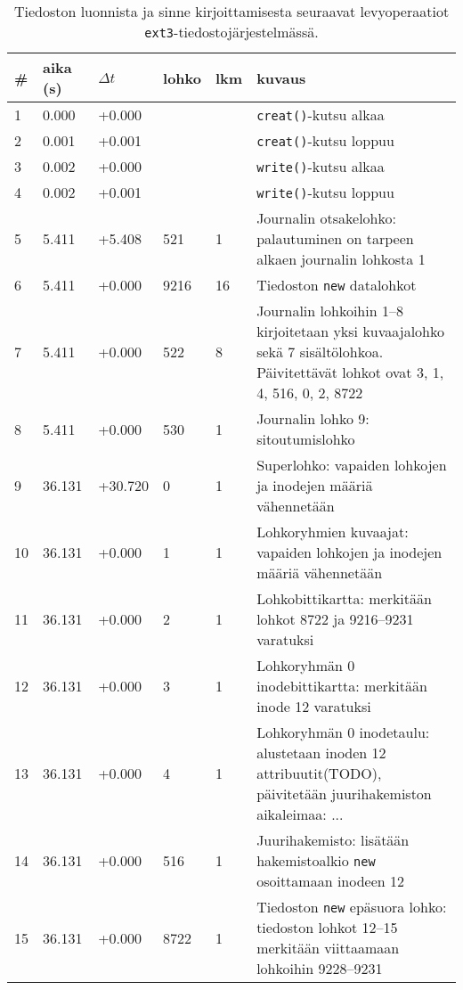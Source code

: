 \begin{table}[H]
\label{TabExt3CreatAndWrite}
\begin{tabular}{l | l | l | l | l | p{7cm}}
    \# & aika (s) & $\Delta t$ & lohko & lkm & kuvaus \\ \hline \hline
    1  & 0.000    & +0.000   &      &      & \texttt{creat()}-kutsu alkaa   \\ \hline %
    2  & 0.001    & +0.001   &      &      & \texttt{creat()}-kutsu loppuu  \\ \hline %
    3  & 0.002    & +0.000   &      &      & \texttt{write()}-kutsu alkaa   \\ \hline %
    4  & 0.002    & +0.001   &      &      & \texttt{write()}-kutsu loppuu  \\ \hline %
    5  & 5.411    & +5.408   & 521  & 1    & Journalin otsakelohko: palautuminen on tarpeen alkaen journalin lohkosta 1                       \\ \hline %
    6  & 5.411    & +0.000   & 9216 & 16   & Tiedoston \texttt{new} datalohkot                               \\ \hline %
    7  & 5.411    & +0.000   & 522  & 8    & Journalin lohkoihin 1--8 kirjoitetaan yksi kuvaajalohko sekä 7 sisältölohkoa. Päivitettävät lohkot ovat 3, 1, 4, 516, 0, 2, 8722                       \\ \hline %
    8  & 5.411    & +0.000   & 530  & 1    & Journalin lohko 9: sitoutumislohko                       \\ \hline %
    9  & 36.131   & +30.720  & 0    & 1    & Superlohko: vapaiden lohkojen ja inodejen määriä vähennetään                     \\ \hline %
    10 & 36.131   & +0.000   & 1    & 1    & Lohkoryhmien kuvaajat: vapaiden lohkojen ja inodejen määriä vähennetään                     \\ \hline %
    11 & 36.131   & +0.000   & 2    & 1    & Lohkobittikartta: merkitään lohkot 8722 ja 9216--9231 varatuksi                     \\ \hline %
    12 & 36.131   & +0.000   & 3    & 1    & Lohkoryhmän 0 inodebittikartta: merkitään inode 12 varatuksi \\ \hline %
    13 & 36.131   & +0.000   & 4    & 1    & Lohkoryhmän 0 inodetaulu: alustetaan inoden 12 attribuutit(TODO), päivitetään juurihakemiston aikaleimaa: ...                     \\ \hline %
    14 & 36.131   & +0.000   & 516  & 1    & Juurihakemisto: lisätään hakemistoalkio \texttt{new} osoittamaan inodeen 12                 \\ \hline %
    15 & 36.131   & +0.000   & 8722 & 1    & Tiedoston \texttt{new} epäsuora lohko: tiedoston lohkot 12--15 merkitään viittaamaan lohkoihin 9228--9231 \\        %
\end{tabular}
\caption{Tiedoston luonnista ja sinne kirjoittamisesta seuraavat levyoperaatiot \texttt{ext3}-tiedostojärjestelmässä.}
\end{table}

